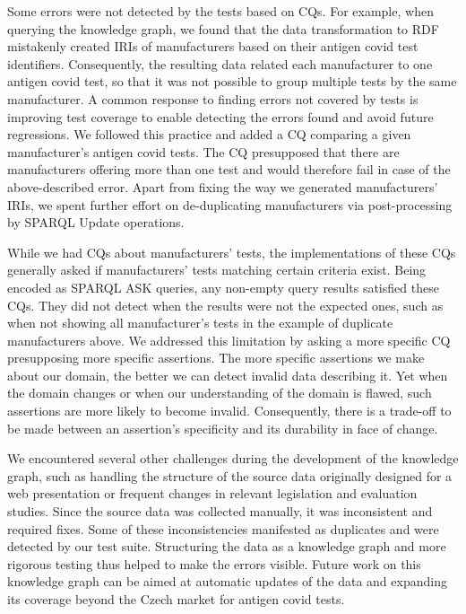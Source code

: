 \documentclass[
]{ceurart}
\begin{document}
Some errors were not detected by the tests based on CQs. For example, when querying the knowledge graph, we found that the data transformation to RDF mistakenly created IRIs of manufacturers based on their antigen covid test identifiers. Consequently, the resulting data related each manufacturer to one antigen covid test, so that it was not possible to group multiple tests by the same manufacturer. A common response to finding errors not covered by tests is improving test coverage to enable detecting the errors found and avoid future regressions. We followed this practice and added a CQ comparing a given manufacturer's antigen covid tests. The CQ presupposed that there are manufacturers offering more than one test and would therefore fail in case of the above-described error. Apart from fixing the way we generated manufacturers' IRIs, we spent further effort on de-duplicating manufacturers via post-processing by SPARQL Update operations.

While we had CQs about manufacturers' tests, the implementations of these CQs generally asked if manufacturers' tests matching certain criteria exist. Being encoded as SPARQL ASK queries, any non-empty query results satisfied these CQs. They did not detect when the results were not the expected ones, such as when not showing all manufacturer's tests in the example of duplicate manufacturers above. We addressed this limitation by asking a more specific CQ presupposing more specific assertions. The more specific assertions we make about our domain, the better we can detect invalid data describing it. Yet when the domain changes or when our understanding of the domain is flawed, such assertions are more likely to become invalid. Consequently, there is a trade-off to be made between an assertion's specificity and its durability in face of change.

We encountered several other challenges during the development of the knowledge graph, such as handling the structure of the source data originally designed for a web presentation or frequent changes in relevant legislation and evaluation studies. Since the source data was collected manually, it was inconsistent and required fixes. Some of these inconsistencies manifested as duplicates and were detected by our test suite. Structuring the data as a knowledge graph and more rigorous testing thus helped to make the errors visible. Future work on this knowledge graph can be aimed at automatic updates of the data and expanding its coverage beyond the Czech market for antigen covid tests.
\end{document}
